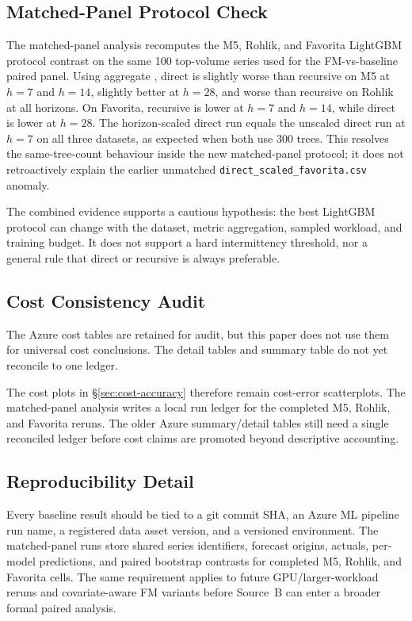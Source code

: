 \subsection{Matched-Panel Protocol Check}

The matched-panel analysis recomputes the M5, Rohlik, and Favorita LightGBM protocol
contrast on the same 100 top-volume series used for the FM-vs-baseline
paired panel.  Using aggregate \WAPE{}, direct is slightly worse than
recursive on M5 at $h=7$ and $h=14$, slightly better at $h=28$, and worse
than recursive on Rohlik at all horizons.  On Favorita, recursive is lower
at $h=7$ and $h=14$, while direct is lower at $h=28$.  The horizon-scaled
direct run equals the unscaled direct run at $h=7$ on all three datasets,
as expected when both use 300 trees.  This resolves the same-tree-count
behaviour inside the new matched-panel protocol; it does not retroactively
explain the earlier unmatched \texttt{direct\_scaled\_favorita.csv} anomaly.

The combined evidence supports a cautious hypothesis: the best LightGBM
protocol can change with the dataset, metric aggregation, sampled workload,
and training budget.  It does not support a hard intermittency threshold,
nor a general rule that direct or recursive is always preferable.

\subsection{Cost Consistency Audit}\label{app:cost-envelope}

The Azure cost tables are retained for audit, but this paper does not use them
for universal cost conclusions.  The detail tables and summary table do
not yet reconcile to one ledger.



The cost plots in \S\ref{sec:cost-accuracy} therefore remain cost-error
scatterplots.  The matched-panel analysis writes a local run ledger for
the completed M5, Rohlik, and Favorita reruns.  The older Azure
summary/detail tables still need a single reconciled ledger before cost
claims are promoted beyond descriptive accounting.

\subsection{Reproducibility Detail}\label{app:reproducibility}

Every baseline result should be tied to a git commit SHA, an Azure ML
pipeline run name, a registered data asset version, and a versioned
environment.  The matched-panel runs store shared series identifiers,
forecast origins, actuals, per-model predictions, and paired bootstrap
contrasts for completed M5, Rohlik, and Favorita cells.  The same requirement
applies to future GPU/larger-workload reruns and covariate-aware FM
variants before Source~B can enter a broader formal paired analysis.
